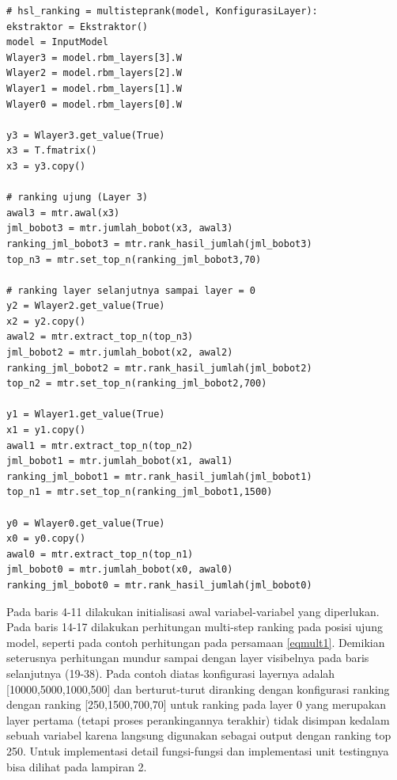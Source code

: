 \begin{lstlisting}[caption=listing multi step, label=mult1,frame=single, basicstyle=\small]
# hsl_ranking = multisteprank(model, KonfigurasiLayer):
ekstraktor = Ekstraktor()
model = InputModel
Wlayer3 = model.rbm_layers[3].W
Wlayer2 = model.rbm_layers[2].W
Wlayer1 = model.rbm_layers[1].W
Wlayer0 = model.rbm_layers[0].W

y3 = Wlayer3.get_value(True)
x3 = T.fmatrix()
x3 = y3.copy()

# ranking ujung (Layer 3)
awal3 = mtr.awal(x3)
jml_bobot3 = mtr.jumlah_bobot(x3, awal3)
ranking_jml_bobot3 = mtr.rank_hasil_jumlah(jml_bobot3)
top_n3 = mtr.set_top_n(ranking_jml_bobot3,70)

# ranking layer selanjutnya sampai layer = 0
y2 = Wlayer2.get_value(True)
x2 = y2.copy()
awal2 = mtr.extract_top_n(top_n3)
jml_bobot2 = mtr.jumlah_bobot(x2, awal2)
ranking_jml_bobot2 = mtr.rank_hasil_jumlah(jml_bobot2)
top_n2 = mtr.set_top_n(ranking_jml_bobot2,700)

y1 = Wlayer1.get_value(True)
x1 = y1.copy()
awal1 = mtr.extract_top_n(top_n2)
jml_bobot1 = mtr.jumlah_bobot(x1, awal1)
ranking_jml_bobot1 = mtr.rank_hasil_jumlah(jml_bobot1)
top_n1 = mtr.set_top_n(ranking_jml_bobot1,1500)

y0 = Wlayer0.get_value(True)
x0 = y0.copy()
awal0 = mtr.extract_top_n(top_n1)
jml_bobot0 = mtr.jumlah_bobot(x0, awal0)
ranking_jml_bobot0 = mtr.rank_hasil_jumlah(jml_bobot0)

\end{lstlisting}

Pada baris 4-11 dilakukan initialisasi awal variabel-variabel yang diperlukan. Pada baris 14-17 dilakukan perhitungan multi-step ranking pada posisi ujung model, seperti pada contoh perhitungan pada persamaan \ref{eqmult1}. Demikian seterusnya perhitungan mundur sampai dengan layer visibelnya pada baris selanjutnya (19-38). Pada contoh diatas konfigurasi layernya adalah [10000,5000,1000,500] dan berturut-turut diranking dengan konfigurasi ranking dengan ranking [250,1500,700,70] untuk ranking pada layer 0 yang merupakan layer pertama (tetapi proses perankingannya terakhir) tidak disimpan kedalam sebuah variabel karena langsung digunakan sebagai output dengan ranking top 250. Untuk implementasi detail fungsi-fungsi dan implementasi unit testingnya bisa dilihat pada lampiran 2.




